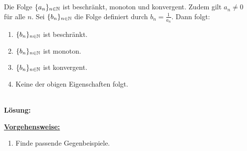 \newpage
\subsection*{}
Die Folge $ \{ a_n \}_{n \in \mathbb{N}} $ ist beschränkt, monoton und konvergent.
Zudem gilt $ a_n \neq 0  $ für alle $ n $.
Sei $ \{b_n\}_{n \in \mathbb{N}} $ die Folge definiert durch $ b_n = \frac{1}{a_n} $.
Dann folgt:
\renewcommand{\labelenumi}{(\alph{enumi})}
\begin{enumerate}
	\item 
	$ \{b_n \}_{n \in \mathbb{N}} $ ist beschränkt.
	\item 
	$ \{b_n\}_{n \in \mathbb{N}} $ ist monoton.
	\item 
	$ \{b_n\}_{n \in \mathbb{N}} $ ist konvergent.
	\item
	Keine der obigen Eigenschaften folgt.
\end{enumerate}
\ \\
\textbf{Lösung:}
\begin{mdframed}
\underline{\textbf{Vorgehensweise:}}
\renewcommand{\labelenumi}{\theenumi.}
\begin{enumerate}
\item Finde passende Gegenbeispiele.
\end{enumerate}
\end{mdframed}

